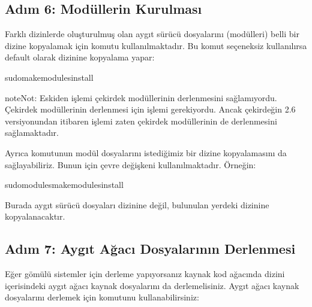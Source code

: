 \documentclass[a4paper,10pt,turkish]{sphinxmanual}
\begin{document}
\subsection{Adım 6: Modüllerin Kurulması}
\label{\detokenize{kernelcompilation:adim-6-modullerin-kurulmasi}}
\sphinxAtStartPar
Farklı dizinlerde oluşturulmuş olan aygıt sürücü dosyalarını (modülleri) belli bir dizine kopyalamak
için  komutu kullanılmaktadır. Bu komut seçeneksiz kullanılırsa default olarak
 dizinine kopyalama yapar:

\begin{sphinxVerbatim}[commandchars=\\\{\}]
\PYGZdl{}sudomakemodules\PYGZus{}install
\end{sphinxVerbatim}

\begin{sphinxadmonition}{note}{Not:}
\sphinxAtStartPar
Eskiden  işlemi çekirdek modüllerinin derlenmesini sağlamıyordu. Çekirdek modüllerinin
derlenmesi için  işlemi gerekiyordu. Ancak çekirdeğin 2.6 versiyonundan itibaren
 işlemi zaten çekirdek modüllerinin de derlenmesini sağlamaktadır.
\end{sphinxadmonition}

\sphinxAtStartPar
Ayrıca  komutunun modül dosyalarını istediğimiz bir dizine kopyalamasını da
sağlayabiliriz. Bunun için  çevre değişkeni kullanılmaktadır. Örneğin:

\begin{sphinxVerbatim}[commandchars=\\\{\}]
\PYGZdl{}sudomodulesmakemodules\PYGZus{}install
\end{sphinxVerbatim}

\sphinxAtStartPar
Burada aygıt sürücü dosyaları  dizinine değil, bulunulan yerdeki
 dizinine kopyalanacaktır.


\subsection{Adım 7: Aygıt Ağacı Dosyalarının Derlenmesi}
\label{\detokenize{kernelcompilation:adim-7-aygit-agaci-dosyalarinin-derlenmesi}}
\sphinxAtStartPar
Eğer gömülü sistemler için derleme yapıyorsanız kaynak kod ağacında
 dizini içerisindeki aygıt ağacı kaynak dosyalarını da derlemelisiniz.
Aygıt ağacı kaynak dosyalarını derlemek için  komutunu kullanabilirsiniz:
\end{document}

